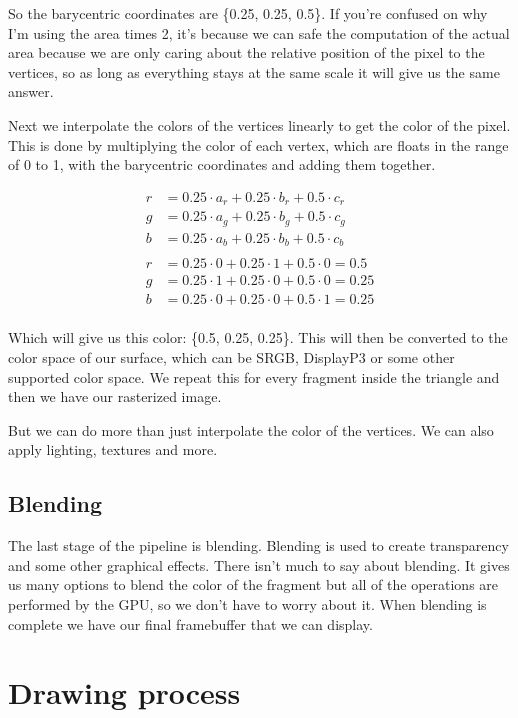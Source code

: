 \documentclass[12pt]{report} \usepackage{preamble}
\begin{document}
So the barycentric coordinates are \{0.25, 0.25, 0.5\}.
If you're confused on why I'm using the area times 2, it's because we can safe the
computation of the actual area because we are only caring about
the relative position of the pixel to the vertices, so as long as everything stays
at the same scale it will give us the same answer.

Next we interpolate the colors of the vertices linearly to get the color of the pixel.
This is done by multiplying the color of each vertex, which are floats in the range of 0 to 1,
with the barycentric coordinates and adding them together.

\[
	\begin{aligned}
		r & = 0.25 \cdot a_r + 0.25 \cdot b_r + 0.5 \cdot c_r  \\
		g & = 0.25 \cdot a_g + 0.25 \cdot b_g + 0.5 \cdot c_g  \\
		b & = 0.25 \cdot a_b + 0.25 \cdot b_b + 0.5 \cdot c_b  \\
		\\
		r & = 0.25 \cdot 0 + 0.25 \cdot 1 + 0.5 \cdot 0 = 0.5  \\
		g & = 0.25 \cdot 1 + 0.25 \cdot 0 + 0.5 \cdot 0 = 0.25 \\
		b & = 0.25 \cdot 0 + 0.25 \cdot 0 + 0.5 \cdot 1 = 0.25 \\
	\end{aligned}
\]

Which will give us this color: \{0.5, 0.25, 0.25\}. This will then be converted to the color
space of our surface, which can be SRGB, DisplayP3 or some other supported color space.
We repeat this for every fragment inside the triangle and then we have our rasterized image.

But we can do more than just interpolate the color of the vertices.
We can also apply lighting, textures and more.

\subsection{Blending}

The last stage of the pipeline is blending. Blending is used to create transparency
and some other graphical effects. There isn't much to say about blending.
It gives us many options to blend the color of the fragment but all of the operations are
performed by the \ac{GPU}, so we don't have to worry about it.
When blending is complete we have our final framebuffer that we can display.

\section{Drawing process}
\end{document}
